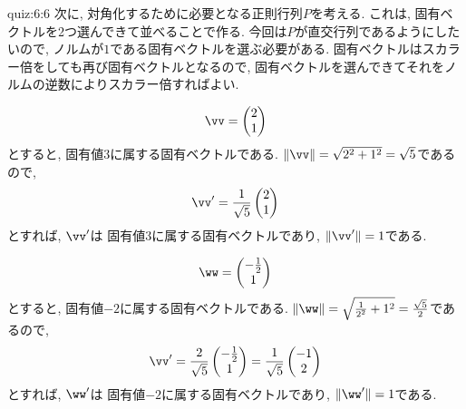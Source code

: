 \begin{answerof}{quiz:6:6}
  次に, 対角化するために必要となる正則行列$P$を考える.
  これは, 固有ベクトルを2つ選んできて並べることで作る.
  今回は$P$が直交行列であるようにしたいので,
  ノルムが$1$である固有ベクトルを選ぶ必要がある.
  固有ベクトルはスカラー倍をしても再び固有ベクトルとなるので,
  固有ベクトルを選んできてそれをノルムの逆数によりスカラー倍すればよい.
  

  \begin{align*}
    \vv=
    \begin{pmatrix}
      2\\1
    \end{pmatrix}
  \end{align*}
  とすると,
  固有値$3$に属する固有ベクトルである.
  $\|\vv\|=\sqrt{2^2+1^2}=\sqrt{5}$であるので,
  \begin{align*}
    \vv'=
    \frac{1}{\sqrt{5}}
    \begin{pmatrix}
      2\\1
    \end{pmatrix}
  \end{align*}
  とすれば, $\vv'$は
  固有値$3$に属する固有ベクトルであり,
  $\|\vv'\|=1$である.

  
  \begin{align*}
    \ww=
    \begin{pmatrix}
      -\frac{1}{2}\\1
    \end{pmatrix}
  \end{align*}
  とすると,
  固有値$-2$に属する固有ベクトルである.
  $\|\ww\|=\sqrt{\frac{1}{2^2}+1^2}=\frac{\sqrt{5}}{2}$であるので,
  \begin{align*}
    \vv'=
    \frac{2}{\sqrt{5}}
    \begin{pmatrix}
      -\frac{1}{2}\\1
    \end{pmatrix}
    =
    \frac{1}{\sqrt{5}}
    \begin{pmatrix}
      -1\\2
    \end{pmatrix}
  \end{align*}
  とすれば, $\ww'$は
  固有値$-2$に属する固有ベクトルであり,
  $\|\ww'\|=1$である.


\end{answerof}
